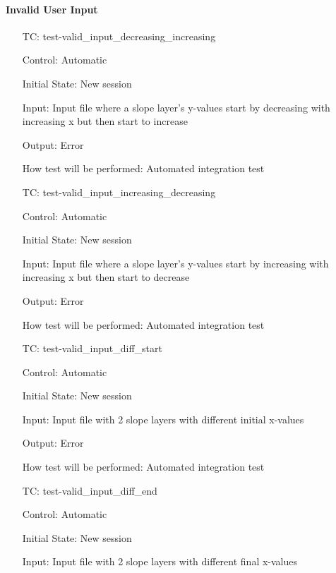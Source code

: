 \documentclass[12pt, titlepage]{article}
\newcounter{testnum} %
\begin{document}
\paragraph{Invalid User Input}

\begin{enumerate}[label=TC\arabic*:,ref={\arabic*}]
	
	\item [TC\refstepcounter{testnum}\thetestnum: \label{TC_InvalidInDecInc}] 
	test-valid\_input\_decreasing\_increasing
	
	Control: Automatic
	
	Initial State: New session
	
	Input: Input file where a slope layer's y-values start by decreasing with 
	increasing x but then start to increase
	
	Output: Error
	
	How test will be performed: Automated integration test
	
	\item [TC\refstepcounter{testnum}\thetestnum: \label{TC_InvalidInIncDec}] 
	test-valid\_input\_increasing\_decreasing
	
	Control: Automatic
	
	Initial State: New session
	
	Input: Input file where a slope layer's y-values start by increasing with 
	increasing x but then start to decrease
	
	Output: Error
	
	How test will be performed: Automated integration test
	
	\item [TC\refstepcounter{testnum}\thetestnum: 
	\label{TC_InvalidInDiffStart}] 
	test-valid\_input\_diff\_start
	
	Control: Automatic
	
	Initial State: New session
	
	Input: Input file with 2 slope layers with different initial x-values
	
	Output: Error
	
	How test will be performed: Automated integration test
	
	\item [TC\refstepcounter{testnum}\thetestnum: \label{TC_InvalidInDiffEnd}] 
	test-valid\_input\_diff\_end
	
	Control: Automatic
	
	Initial State: New session
	
	Input: Input file with 2 slope layers with different final x-values
	

\end{enumerate}
\end{document}
